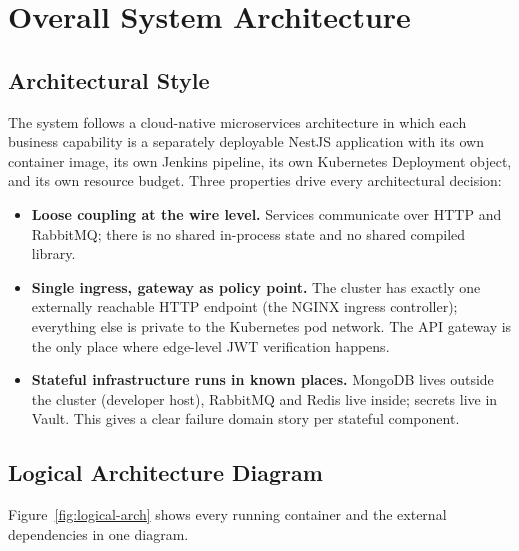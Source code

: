 \documentclass[11pt,a4paper]{article}
\begin{document}
\section{Overall System Architecture}

\subsection{Architectural Style}
The system follows a cloud-native microservices architecture in which
each business capability is a separately deployable NestJS application
with its own container image, its own Jenkins pipeline, its own
Kubernetes Deployment object, and its own resource budget.  Three
properties drive every architectural decision:

\begin{itemize}[leftmargin=*]
  \item \textbf{Loose coupling at the wire level.}  Services
        communicate over HTTP and RabbitMQ; there is no shared
        in-process state and no shared compiled library.
  \item \textbf{Single ingress, gateway as policy point.}  The
        cluster has exactly one externally reachable HTTP endpoint
        (the NGINX ingress controller); everything else is private to
        the Kubernetes pod network.  The API gateway is the only place
        where edge-level JWT verification happens.
  \item \textbf{Stateful infrastructure runs in known places.}
        MongoDB lives outside the cluster (developer host), RabbitMQ
        and Redis live inside; secrets live in Vault.  This gives a
        clear failure domain story per stateful component.
\end{itemize}

\subsection{Logical Architecture Diagram}
Figure~\ref{fig:logical-arch} shows every running container and the
external dependencies in one diagram.
\end{document}
